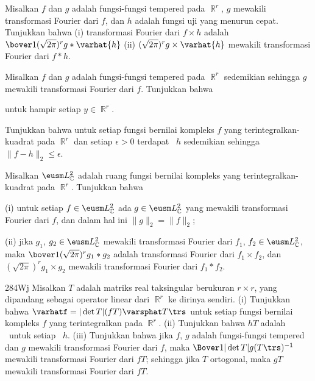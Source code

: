 { Misalkan $f$ dan $g$ adalah fungsi-fungsi tempered pada
$\BbbR^r$, $g$ mewakili transformasi Fourier dari $f$, dan $h$ adalah fungsi
uji yang menurun cepat. Tunjukkan bahwa (i) transformasi Fourier dari
$f\times h$ adalah $\bover1{(\sqrt{2\pi})^r}g*\varhat{h}$ (ii)
$(\sqrt{2\pi})^rg\times\varhat{h}$ mewakili transformasi Fourier dari $f*h$.

 Misalkan $f$ dan $g$ adalah fungsi-fungsi tempered pada
$\BbbR^r$ sedemikian sehingga $g$ mewakili transformasi Fourier dari $f$.
Tunjukkan bahwa


\noindent untuk hampir setiap $y\in\BbbR^r$.

 Tunjukkan bahwa untuk setiap fungsi bernilai kompleks
$f$ yang terintegralkan-kuadrat pada $\BbbR^r$ dan setiap $\epsilon>0$ terdapat
\rdtf\ $h$ sedemikian sehingga $\|f-h\|_2\le\epsilon$.

 Misalkan $\eusm L_{\Bbb C}^2$ adalah ruang fungsi
bernilai kompleks yang terintegralkan-kuadrat pada $\BbbR^r$.
Tunjukkan bahwa

\quad (i) untuk setiap $f\in\eusm L_{\Bbb C}^2$ ada $g\in\eusm L_{\Bbb C}^2$
yang mewakili transformasi Fourier dari $f$, dan dalam hal ini
$\|g\|_2=\|f\|_2$;

\quad (ii) jika $g_1$, $g_2\in\eusm L_{\Bbb C}^2$ mewakili transformasi
Fourier dari $f_1$, $f_2\in\eusm L_{\Bbb C}^2$, maka
$\bover1{(\sqrt{2\pi})^r}g_1*g_2$ adalah transformasi Fourier dari $f_1\times
f_2$, dan $(\sqrt{2\pi})^rg_1\times g_2$ mewakili transformasi Fourier dari
$f_1*f_2$.

\spheader 284Wj Misalkan $T$ adalah matriks real taksingular berukuran
$r\times r$, yang dipandang sebagai operator linear dari $\BbbR^r$ ke dirinya
sendiri. (i) Tunjukkan bahwa $\varhatf=|\det T|(fT)\varsphat T\trs$ untuk setiap
fungsi bernilai kompleks $f$ yang terintegralkan pada $\BbbR^r$. (ii)
Tunjukkan bahwa $hT$ adalah \rdtf\ untuk setiap \rdtf\ $h$. (iii) Tunjukkan
bahwa jika $f$, $g$ adalah fungsi-fungsi tempered dan $g$ mewakili transformasi
Fourier dari $f$, maka $\Bover1{|\det T|}g(T\trs)^{-1}$ mewakili transformasi
Fourier dari $fT$; sehingga jika $T$ ortogonal, maka $gT$ mewakili transformasi
Fourier dari $fT$.
}%

